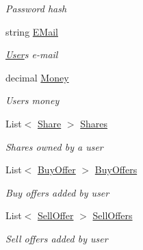 \begin{DoxyCompactItemize}
\begin{DoxyCompactList}\small\item\em Password hash \end{DoxyCompactList}\item 
string \mbox{\hyperlink{class_gielda_l2_1_1_d_b_1_1_entities_1_1_user_acbb08bc936b605c2e371dcdaa8597c73}{E\+Mail}}
\begin{DoxyCompactList}\small\item\em \mbox{\hyperlink{class_gielda_l2_1_1_d_b_1_1_entities_1_1_user}{User}}\textquotesingle{}s e-\/mail \end{DoxyCompactList}\item 
decimal \mbox{\hyperlink{class_gielda_l2_1_1_d_b_1_1_entities_1_1_user_a3e4d2c629ce72c856449a96ccc19d2b1}{Money}}
\begin{DoxyCompactList}\small\item\em Users money \end{DoxyCompactList}\item 
List$<$ \mbox{\hyperlink{class_gielda_l2_1_1_d_b_1_1_entities_1_1_share}{Share}} $>$ \mbox{\hyperlink{class_gielda_l2_1_1_d_b_1_1_entities_1_1_user_a0758d1665b5e2851e9ce7251e4bae275}{Shares}}
\begin{DoxyCompactList}\small\item\em Shares owned by a user \end{DoxyCompactList}\item 
List$<$ \mbox{\hyperlink{class_gielda_l2_1_1_d_b_1_1_entities_1_1_buy_offer}{Buy\+Offer}} $>$ \mbox{\hyperlink{class_gielda_l2_1_1_d_b_1_1_entities_1_1_user_a207d26ff49c263303059d1a7eb89b454}{Buy\+Offers}}
\begin{DoxyCompactList}\small\item\em Buy offers added by user \end{DoxyCompactList}\item 
List$<$ \mbox{\hyperlink{class_gielda_l2_1_1_d_b_1_1_entities_1_1_sell_offer}{Sell\+Offer}} $>$ \mbox{\hyperlink{class_gielda_l2_1_1_d_b_1_1_entities_1_1_user_a16aef4c209ce1d029f541ef69608ca82}{Sell\+Offers}}
\begin{DoxyCompactList}\small\item\em Sell offers added by user \end{DoxyCompactList}\end{DoxyCompactItemize}



